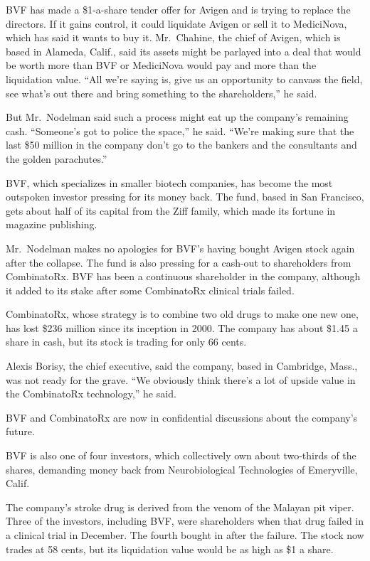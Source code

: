 \documentclass[12pt,a4paper,onecolumn]{article}
\begin{document}
\begin{CJK*}{GBK}{song}
BVF has made a \$1-a-share tender offer for Avigen and is trying to replace the directors. If it
gains control, it could liquidate Avigen or sell it to MediciNova, which has said it wants to buy
it. Mr.~Chahine, the chief of Avigen, which is based in Alameda, Calif., said its assets might be
parlayed into a deal that would be worth more than BVF or MediciNova would pay and more than the
liquidation value. ``All we're saying is, give us an opportunity to canvass the field, see what's
out there and bring something to the shareholders,'' he said.

But Mr.~Nodelman said such a process might eat up the company's remaining cash. ``Someone's got to
police the space,'' he said. ``We're making sure that the last \$50 million in the company don't go
to the bankers and the consultants and the golden parachutes.''

BVF, which specializes in smaller biotech companies, has become the most outspoken investor pressing
for its money back. The fund, based in San Francisco, gets about half of its capital from the Ziff
family, which made its fortune in magazine publishing.

Mr.~Nodelman makes no apologies for BVF's having bought Avigen stock again after the collapse. The
fund is also pressing for a cash-out to shareholders from CombinatoRx. BVF has been a continuous
shareholder in the company, although it added to its stake after some CombinatoRx clinical trials
failed.

CombinatoRx, whose strategy is to combine two old drugs to make one new one, has lost \$236 million
since its inception in 2000. The company has about \$1.45 a share in cash, but its stock is trading
for only 66 cents.

Alexis Borisy, the chief executive, said the company, based in Cambridge, Mass., was not ready for
the grave. ``We obviously think there's a lot of upside value in the CombinatoRx technology,'' he
said.

BVF and CombinatoRx are now in confidential discussions about the company's future.

BVF is also one of four investors, which collectively own about two-thirds of the shares, demanding
money back from Neurobiological Technologies of Emeryville, Calif.

The company's stroke drug is derived from the venom of the Malayan pit viper. Three of the
investors, including BVF, were shareholders when that drug failed in a clinical trial in December.
The fourth bought in after the failure. The stock now trades at 58 cents, but its liquidation value
would be as high as \$1 a share.


\end{CJK*}
\end{document}
